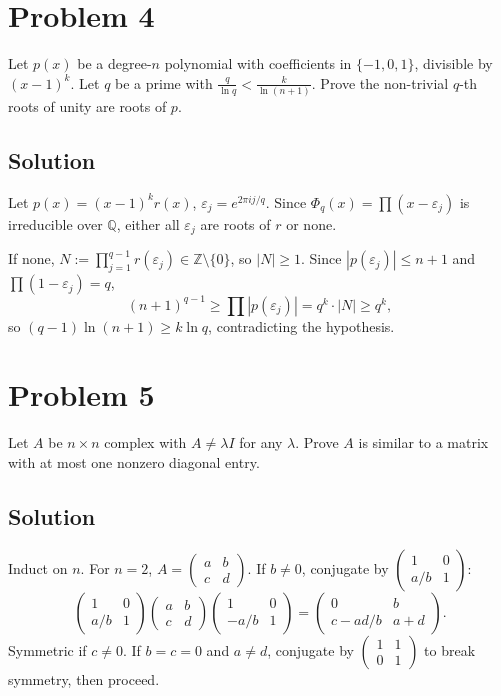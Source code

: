 \documentclass{article}
\begin{document}
\section*{Problem 4}
Let $p(x)$ be a degree-$n$ polynomial with coefficients in $\{-1,0,1\}$, divisible by $(x-1)^k$. Let $q$ be a prime with $\frac{q}{\ln q}<\frac{k}{\ln(n+1)}$. Prove the non-trivial $q$-th roots of unity are roots of $p$.

\subsection*{Solution}
Let $p(x)=(x-1)^k r(x)$, $\varepsilon_j=e^{2\pi i j/q}$. Since $\Phi_q(x)=\prod(x-\varepsilon_j)$ is irreducible over $\mathbb{Q}$, either all $\varepsilon_j$ are roots of $r$ or none.

If none, $N:=\prod_{j=1}^{q-1} r(\varepsilon_j)\in\mathbb{Z}\setminus\{0\}$, so $|N|\ge 1$. Since $|p(\varepsilon_j)|\le n+1$ and $\prod(1-\varepsilon_j)=q$,
\[(n+1)^{q-1}\ge \prod|p(\varepsilon_j)| = q^k \cdot |N| \ge q^k,\]
so $(q-1)\ln(n+1)\ge k\ln q$, contradicting the hypothesis.

\section*{Problem 5}
Let $A$ be $n\times n$ complex with $A\ne \lambda I$ for any $\lambda$. Prove $A$ is similar to a matrix with at most one nonzero diagonal entry.

\subsection*{Solution}
Induct on $n$. For $n=2$, $A=\begin{pmatrix}a&b\\c&d\end{pmatrix}$. If $b\ne 0$, conjugate by $\begin{pmatrix}1&0\\a/b&1\end{pmatrix}$:
\[\begin{pmatrix}1&0\\a/b&1\end{pmatrix}\begin{pmatrix}a&b\\c&d\end{pmatrix}\begin{pmatrix}1&0\\-a/b&1\end{pmatrix} = \begin{pmatrix}0&b\\c-ad/b&a+d\end{pmatrix}.\]
Symmetric if $c\ne 0$. If $b=c=0$ and $a\ne d$, conjugate by $\begin{pmatrix}1&1\\0&1\end{pmatrix}$ to break symmetry, then proceed.
\end{document}
